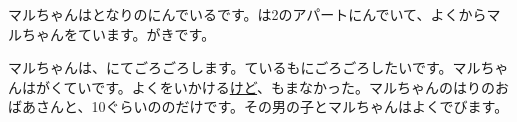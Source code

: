 
\author{Tomislav Mamić}

	
	
	マルちゃんはとなりのにんでいるです。は2のアパートにんでいて、よくからマルちゃんをています。がきです。
	
	マルちゃんは、\hspace{10pt}にてごろごろします。ているもにごろごろしたいです。マルちゃんはがくていです。よくをいかける\underline{けど}、もまなかった。マルちゃんのはりのおばあさんと、10ぐらいののだけです。その男の子とマルちゃんはよくでびます。

